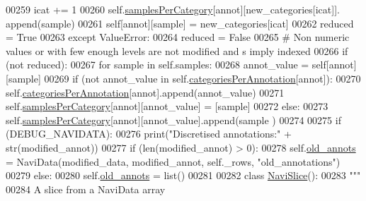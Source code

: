 \begin{DoxyCode}
00259                                 icat += 1
00260                             self.\hyperlink{classnavicom_1_1navidata_1_1NaviAnnotations_a7cbb4ab623948f19e055f5b4b7c938a9}{samplesPerCategory}[annot][new\_categories[icat]].
      append(sample)
00261                             self[annot][sample] = new\_categories[icat]
00262                     reduced = \textcolor{keyword}{True}
00263                 \textcolor{keywordflow}{except} ValueError: 
00264                     reduced = \textcolor{keyword}{False}
00265             \textcolor{comment}{# Non numeric values or with few enough levels are not modified and s
      imply indexed}
00266             \textcolor{keywordflow}{if} (\textcolor{keywordflow}{not} reduced):
00267                 \textcolor{keywordflow}{for} sample \textcolor{keywordflow}{in} self.samples:
00268                     annot\_value = self[annot][sample]
00269                     \textcolor{keywordflow}{if} (\textcolor{keywordflow}{not} annot\_value \textcolor{keywordflow}{in} self.\hyperlink{classnavicom_1_1navidata_1_1NaviAnnotations_a1c26e115cb2eabe4384cd2fa0c7f776f}{categoriesPerAnnotation}[annot]):
00270                         self.\hyperlink{classnavicom_1_1navidata_1_1NaviAnnotations_a1c26e115cb2eabe4384cd2fa0c7f776f}{categoriesPerAnnotation}[annot].append(annot\_value)
00271                         self.\hyperlink{classnavicom_1_1navidata_1_1NaviAnnotations_a7cbb4ab623948f19e055f5b4b7c938a9}{samplesPerCategory}[annot][annot\_value] = [sample]
00272                     \textcolor{keywordflow}{else}:
00273                         self.\hyperlink{classnavicom_1_1navidata_1_1NaviAnnotations_a7cbb4ab623948f19e055f5b4b7c938a9}{samplesPerCategory}[annot][annot\_value].append(sample
      )
00274 
00275         \textcolor{keywordflow}{if} (DEBUG\_NAVIDATA):
00276             \textcolor{keywordflow}{print}(\textcolor{stringliteral}{"Discretised annotations:"} + str(modified\_annot))
00277         \textcolor{keywordflow}{if} (len(modified\_annot) > 0):
00278             self.\hyperlink{classnavicom_1_1navidata_1_1NaviAnnotations_ab053ca65505c1a9d72e2afb96ddcae9c}{old_annots} = NaviData(modified\_data, modified\_annot, self.\_rows,
       \textcolor{stringliteral}{"old\_annotations"})
00279         \textcolor{keywordflow}{else}:
00280             self.\hyperlink{classnavicom_1_1navidata_1_1NaviAnnotations_ab053ca65505c1a9d72e2afb96ddcae9c}{old_annots} = list()
00281 
00282 \textcolor{keyword}{class }\hyperlink{classnavicom_1_1navidata_1_1NaviSlice}{NaviSlice}():
00283     \textcolor{stringliteral}{"""}
00284 \textcolor{stringliteral}{    A slice from a NaviData array}

\end{DoxyCode}
